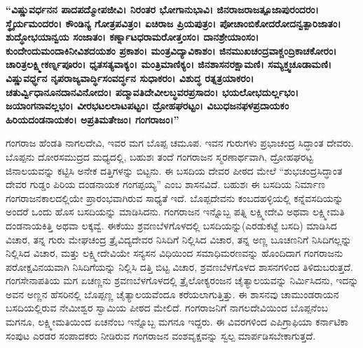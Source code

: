 \textbf{“ವಿಷ್ಣುವರ್ಧನನ ಪಾದಪದ್ಮೋಪಜೀವಿ। ನಿರಂತರ ಭೋಗಾನುಭಾವಿ। ಜಿನರಾಜರಾಜತ್ಪೂಜಾಪುರಂದರಂ।\general{\break } ಸ್ಥೈರ್ಯಮಂದರಂ। ಕೌಂಡಿನ್ಯ ಗೋತ್ರಪವಿತ್ರಂ। ಏಚಿರಾಜ ಪ್ರಿಯಪುತ್ರಂ। ಪೋಚಾಂಬಿಕೋದರೋದನ್ವತ್ಪಾರಿಜಾತಂ।\general{\break } ಶುದ್ಧೋಭಯಾನ್ವಯ ಸಂಜಾತಂ। ಕರ್ಣ್ನಾಟಧರಾಮರೋತ್ತಂಸಂ। ದಾನಶ್ರೇಯಾಂಸಂ। ಕುಂದೇಂದುಮಂದಾಕಿನೀವಿಶದಯಶಂ ಪ್ರಕಾಶಂ। ಮಂತ್ರವಿದ್ಯಾವಿಕಾಶಂ। ಜಿನಮುಖಚಂದ್ರವಾಕ್ಚಂದ್ರಿಕಾಚಕೋರಂ। ಚಾರಿತ್ರಲಕ್ಷ್ಮೀಕರ್ಣ್ನಪೂರಂ। ಧೃತಸತ್ಯವಾಕ್ಯಂ। ಮಂತ್ರಿಮಾಣಿಕ್ಯಂ। ಜಿನಶಾಸನರಕ್ಷಾಮಣಿ। ಸಮ್ಯಕ್ತ್ವಚೂಡಾಮಣಿ। ವಿಷ್ಣುವರ್ಧ್ಧನ ನೃಪರಾಜ್ಯವಾರ್ದ್ಧಿಸಂವರ್ದ್ಧನ ಸುಧಾಕರಂ। ವಿಶುದ್ಧ ರತ್ನತ್ರಯಾಕರಂ। ಚತುರ್ವ್ವಿಧಾನೂನದಾನವಿನೋದಂ। ಪದ್ಮಾವತಿದೇವೀಲಬ್ಧವರಪ್ರಸಾದಂ। ಭಯಲೋಭದುರ್ಲ್ಲಭಂ। ಜಯಾಂಗನಾವಲ್ಲಭಂ। ವೀರಭಟಲಲಾಟಪಟ್ಟಂ। ದ್ರೋಹಘರಟ್ಟಂ। ವಿಬುಧಜನಫಳಪ್ರದಾಯಕಂ ಹಿರಿಯದಂಡನಾಯಕಂ। ಅಪ್ರತಿಮತೇಜಂ। ಗಂಗರಾಜಂ।”}

ಗಂಗರಾಜ ಹೆಂಡತಿ ನಾಗಲದೇವಿ, ಇವರ ಮಗ ಬೊಪ್ಪ ಚಮೂಪ. ಇವನ ಗುರುಗಳು ಪ್ರಭಾಚಂದ್ರ ಸಿದ್ಧಾಂತ ದೇವರು. ಬೊಪ್ಪನು ದೋರಸಮುದ್ರದ ಮಧ್ಯದಲ್ಲಿ, ಬಹುಶಃ ತಂದೆ ಗಂಗರಾಜನ ಸ್ಮರಣಾರ್ಥವಾಗಿ, ದ್ರೋಹಘರಟ್ಟ ಜಿನಾಲಯವನ್ನು ಕಟ್ಟಿಸಿ ಅನೇಕ ದತ್ತಿಗಳನ್ನು ಬಿಟ್ಟನು. ಈ ಬಸದಿಯ ದೇವರ ಪೀಠದ ಮೇಲೆ “ಶುಭಚಂದ್ರಸಿದ್ಧಾಂತ ದೇವರ ಗುಡ್ಡಂ ಪಿರಿಯ ದಂಡನಾಯಕ ಗಂಗಪ್ಪಯ್ಯ” ಎಂಬ ಶಾಸನವಿದೆ. ಬಹುಶಃ ಈ ಬಸದಿಯ ನಿರ್ಮಾಣ ಗಂಗರಾಜನಕಾಲದಲ್ಲಿಯೇ ಪ್ರಾರಂಭವಾಗಿರುವ ಸಾಧ್ಯತೆ ಇದೆ. ಬೊಪ್ಪದೇವನು ಕಂಬದಹಳ್ಳಿಯಲ್ಲಿ ಕನ್ನೆವಸದಿಯನ್ನು ಅಂದರೆ ಒಂದು ಹೊಸ ಬಸದಿಯನ್ನು ಮಾಡಿಸಿದನು. ಗಂಗರಾಜನ ಇನ್ನೊಬ್ಬ ಪತ್ನಿ ಲಕ್ಷ್ಮೀದೇವಿ ಅಥವಾ ಲಕ್ಷ್ಮೀಮತಿ ದಂಡನಾಯಕಿತ್ತಿ ಅಥವಾ ಲಕ್ಕವ್ವೆ. ಈಕೆಯು ಶ್ರವಣಬೆಳಗೊಳದಲ್ಲಿ ಬಸದಿಯನ್ನು(ಎರಡುಕಟ್ಟೆ ಬಸದಿ) ಮಾಡಿಸಿದ ವಿಚಾರ, ತನ್ನ ಗುರು ಮೇಘಚಂದ್ರ ತ್ರೈವಿದ್ಯದೇವರ ನಿಸಿದಿಗೆ ನಿಲ್ಲಿಸಿದ ವಿಚಾರ, ತನ್ನ ಅಣ್ಣ ಬೂಚಣನಿಗೆ ನಿಸಿದಿಗಲ್ಲನ್ನು ನಿಲ್ಲಿಸಿದ ವಿಚಾರ, ಮತ್ತು ಲಕ್ಷ್ಮೀದೇವಿಯೇ ಸನ್ಯಸನ ವಿಧಿಯಿಂದ ಸಮಾಧಿಮರಣವನ್ನು ಹೊಂದಿದಾಗ ಗಂಗರಾಜನು ಪರೋಕ್ಷವಿನಯವಾಗಿ ನಿಸಿದಿಗೆಯನ್ನು ನಿಲ್ಲಿಸಿ ದತ್ತಿ ಬಿಟ್ಟ ವಿಚಾರ, ಶ್ರವಣಬೆಳಗೊಳದ ಶಾಸನಗಳಿಂದ ತಿಳಿದುಬರುತ್ತದೆ. ಗಂಗಸೇನಾಪತಿಯ ಮಗ ಏಚಣ್ಣನು ಶ್ರವಣಬೆಳಗೊಳದಲ್ಲಿ ತ್ರೈಲೋಕ್ಯರಂಜನ ಚೈತ್ಯಾಲಯವನ್ನು ನಿರ್ಮಿಸಿದನು, ಇದನ್ನು ಅವನ ಅಣ್ಣನ ಹೆಸರಿನಲ್ಲಿ ಬೊಪ್ಪಣ್ಣ ಚೈತ್ಯಾಲಯವೆಂದೂ ಕರೆಯಲಾಗುತ್ತಿತ್ತು. ಈ ಶಾಸನವು ಚಾಮುಂಡರಾಯನ ಬಸದಿಯಲ್ಲಿರುವ ನೇಮೀಶ್ವರ ಸ್ವಾಮಿಯ ಪೀಠದ ಮೇಲಿದೆ. ಗಂಗರಾಜನಿಗೆ ನಾಗಲದೇವಿಯಿಂದ ಬೊಪ್ಪನೆಂಬ ಮಗನೂ, ಲಕ್ಷ್ಮೀಮತಿಯಿಂದ ಏಚನೆಂಬ ಇನ್ನೊಬ್ಬ ಮಗನೂ ಇದ್ದರು. ಈ ವಿವರಗಳಿಂದ ಎಪಿಗ್ರಾಫಿಯಾ ಕರ್ನಾಟಿಕಾ ಸಂಪುಟ ಎರಡರ ಸಂಪಾದಕರು ನೀಡಿರುವ ಗಂಗರಾಜನ ವಂಶವೃಕ್ಷವನ್ನು ಸ್ವಲ್ಪ ಮಾರ್ಪಡಿಸಬೇಕಾಗುತ್ತದೆ.


